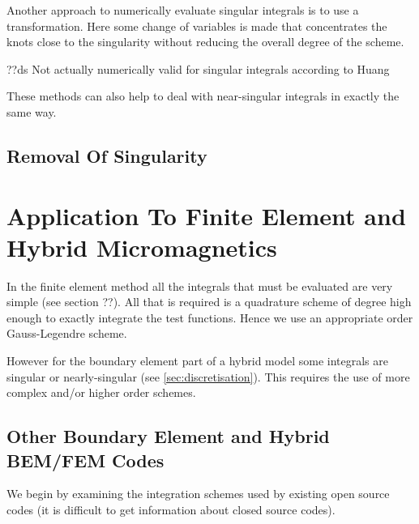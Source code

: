 Another approach to numerically evaluate singular integrals is to use a transformation. Here some change of variables is made that concentrates the knots close to the singularity without reducing the overall degree of the scheme.

??ds Not actually numerically valid for singular integrals according to Huang\cite{Huang1993}






These methods can also help to deal with near-singular integrals in exactly the same way.

\subsection{Removal Of Singularity}




\section{Application To Finite Element and Hybrid Micromagnetics}

In the finite element method all the integrals that must be evaluated are very simple (see section ??). All that is required is a quadrature scheme of degree high enough to exactly integrate the test functions. Hence we use an appropriate order Gauss-Legendre scheme.

However for the boundary element part of a hybrid model some integrals are singular or nearly-singular (see \autoref{sec:discretisation}). This requires the use of more complex and/or higher order schemes.

\subsection{Other Boundary Element and Hybrid BEM/FEM Codes}

We begin by examining the integration schemes used by existing open source codes (it is difficult to get information about closed source codes).

